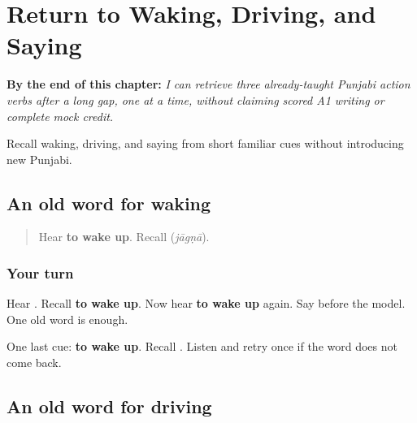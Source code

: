 
\chapter{Return to Waking, Driving, and Saying}
\label{ch:pa-three-familiar-actions-r4}

\begin{chapteropening}
\textbf{By the end of this chapter:} \emph{I can retrieve three already-taught Punjabi action verbs after a long gap, one at a time, without claiming scored A1 writing or complete mock credit.}

Recall waking, driving, and saying from short familiar cues without introducing new Punjabi.
\end{chapteropening}

\section[\texorpdfstring{\pa{ਜਾਗਣਾ} (jāgṇā)}{ਜਾਗਣਾ (jāgṇā)}]{An old word for waking}

\label{lesson:PA-R164-wake-again}



\begin{quote}
Hear \textbf{to wake up}. Recall \textbf{} (\emph{jāgṇā}).
\end{quote}

\subsection*{Your turn}
Hear \textbf{}. Recall \textbf{to wake up}. Now hear \textbf{to wake up} again. Say \textbf{} before the model. One old word is enough.

\begin{tcolorbox}[breakable,colback=teal!4,colframe=teal!35!black,title={Before you move on}]
One last cue: \textbf{to wake up}. Recall \textbf{}. Listen and retry once if the word does not come back.
\end{tcolorbox}
\section[\texorpdfstring{\pa{ਚਲਾਉਣਾ} (calāuṇā)}{ਚਲਾਉਣਾ (calāuṇā)}]{An old word for driving}


